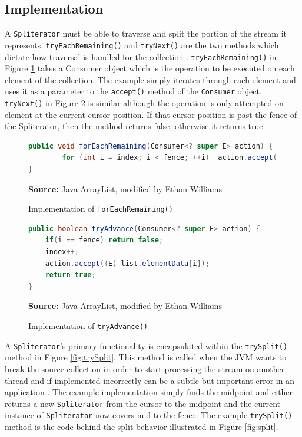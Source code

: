 \documentclass[oneside, 12pt]{article}
\newcommand{\source}[1]{\textbf{Source:} {#1} }
\begin{document}
\subsection{Implementation} 
A \verb|Spliterator| must be able to traverse and split the portion of the stream it represents. \verb|tryEachRemaining()| and \verb|tryNext()| are the two methods which dictate how traversal is handled for the collection \autocite{split_doc}. \verb|tryEachRemaining()| in Figure \ref{fig:forEachRemaining} takes a Consumer object which is the operation to be executed on each element of the collection. The example simply iterates through each element and uses it as a parameter to the \verb|accept()| method of the \verb|Consumer| object. \verb|tryNext()| in Figure \ref{fig:tryAdvance} is similar although the operation is only attempted on element at the current cursor position. If that cursor position is past the fence of the Spliterator, then the method returns false, otherwise it returns true.

\begin{figure}[H]
\centering
\begin{lstlisting}[language=Java]
public void forEachRemaining(Consumer<? super E> action) {
        for (int i = index; i < fence; ++i)  action.accept((E) list.elementData[i]);
}
\end{lstlisting}
\caption{Implementation of {\tt forEachRemaining()}}
\source{Java ArrayList, modified by Ethan Williams}
\label{fig:forEachRemaining}
\end{figure}

\begin{figure}[H]
\centering
\begin{lstlisting}[language=Java]
public boolean tryAdvance(Consumer<? super E> action) {
    if(i == fence) return false;
    index++;
    action.accept((E) list.elementData[i]);
    return true;
}
\end{lstlisting}
\caption{Implementation of {\tt tryAdvance()}}
\source{Java ArrayList, modified by Ethan Williams}
\label{fig:tryAdvance}
\end{figure}

A \verb|Spliterator|'s primary functionality is encapsulated within the \verb|trySplit()| method in Figure \ref{fig:trySplit}. This method is called when the JVM wants to break the source collection in order to start processing the stream on another thread and if implemented incorrectly can be a subtle but important error in an application \autocite{split_doc}. The example implementation simply finds the midpoint and either returns a new \verb|Spliterator| from the cursor to the midpoint and the current instance of \verb|Spliterator| now covers mid to the fence. The example \verb|trySplit()| method is the code behind the split behavior illustrated in Figure \ref{fig:split}.
\end{document}
